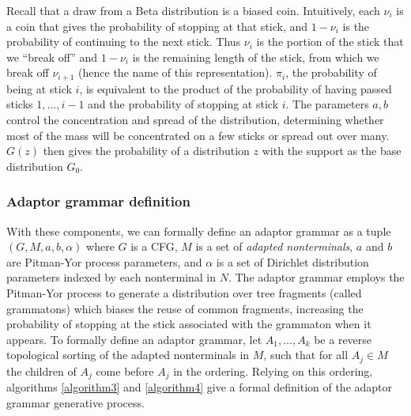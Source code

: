 \documentclass[12pt,letterpaper]{article}
\begin{document}
Recall that a draw from a Beta distribution is a biased coin. Intuitively, each $\nu_i$ is a coin that gives the probability of stopping at that stick, and $1-\nu_i$ is the probability of continuing to the next stick. Thus $\nu_i$ is the portion of the stick that we ``break off'' and $1-\nu_i$ is the remaining length of the stick, from which we break off $\nu_{i+1}$ (hence the name of this representation). $\pi_i$, the probability of being at stick $i$, is equivalent to the product of the probability of having passed sticks $1,...,i-1$ and the probability of stopping at stick $i$. The parameters $a,b$ control the concentration and spread of the distribution, determining whether most of the mass will be concentrated on a few sticks or spread out over many. $G(z)$ then gives the probability of a distribution $z$ with the support as the base distribution $G_0$. 

\subsubsection{Adaptor grammar definition}
With these components, we can formally define an adaptor grammar as a tuple $(G, M, a, b, \alpha)$ where $G$ is a CFG, $M$ is a set of \textit{adapted nonterminals}, $a$ and $b$ are Pitman-Yor process parameters, and $\alpha$ is a set of Dirichlet distribution parameters indexed by each nonterminal in $N$. The adaptor grammar employs the Pitman-Yor process to generate a distribution over tree fragments (called grammatons) which biases the reuse of common fragments, increasing the probability of stopping at the stick associated with the grammaton when it appears. To formally define an adaptor grammar, let $A_1,\ldots,A_k$ be a reverse topological sorting of the adapted nonterminals in $M$, such that for all $A_j \in M$ the children of $A_j$ come before $A_j$ in the ordering. Relying on this ordering, algorithms \hyperref[algorithm3]{\ref*{algorithm3}} and \hyperref[algorithm4]{\ref*{algorithm4}} give a formal definition of the adaptor grammar generative process.

\end{document}
